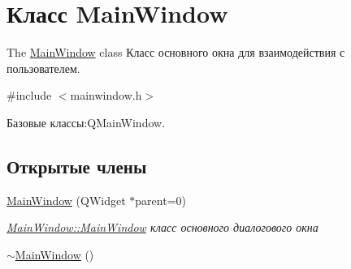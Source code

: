 \hypertarget{class_main_window}{\section{Класс Main\+Window}
\label{class_main_window}
}


The \hyperlink{class_main_window}{Main\+Window} class Класс основного окна для взаимодействия с пользователем.  




{\ttfamily \#include $<$mainwindow.\+h$>$}



Базовые классы\+:Q\+Main\+Window.

\subsection*{Открытые члены}
\begin{DoxyCompactItemize}
\item 
\hyperlink{class_main_window_a8b244be8b7b7db1b08de2a2acb9409db}{Main\+Window} (Q\+Widget $\ast$parent=0)
\begin{DoxyCompactList}\small\item\em \hyperlink{class_main_window_a8b244be8b7b7db1b08de2a2acb9409db}{Main\+Window\+::\+Main\+Window} класс основного диалогового окна \end{DoxyCompactList}\item 
\hyperlink{class_main_window_ae98d00a93bc118200eeef9f9bba1dba7}{$\sim$\+Main\+Window} ()
\end{DoxyCompactItemize}
